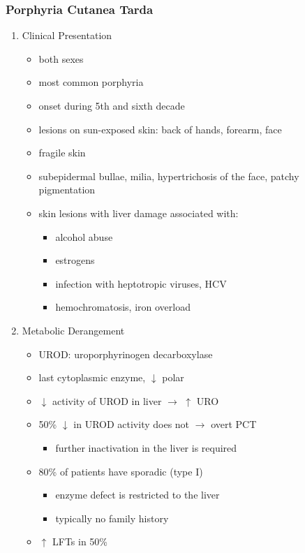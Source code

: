 \documentclass[12pt]{scrartcl}
\begin{document}
\subsubsection{Porphyria Cutanea Tarda}
\label{sec:org05aea69}
\begin{enumerate}
\item Clinical Presentation
\label{sec:orgce4fb31}
\begin{itemize}
\item both sexes
\item most common porphyria
\item onset during 5th and sixth decade
\item lesions on sun-exposed skin: back of hands, forearm, face
\item fragile skin
\item subepidermal bullae, milia, hypertrichosis of the face, patchy pigmentation
\item skin lesions with liver damage associated with:
\begin{itemize}
\item alcohol abuse
\item estrogens
\item infection with heptotropic viruses, HCV
\item hemochromatosis, iron overload
\end{itemize}
\end{itemize}
\item Metabolic Derangement
\label{sec:org9eb0249}
\begin{itemize}
\item UROD: uroporphyrinogen decarboxylase
\item last cytoplasmic enzyme, \(\downarrow\) polar
\item \(\downarrow\) activity of UROD in liver \(\to\) \(\uparrow\) URO
\item 50\% \(\downarrow\) in UROD activity does not \(\to\) overt PCT
\begin{itemize}
\item further inactivation in the liver is required
\end{itemize}
\item 80\% of patients have sporadic (type I)
\begin{itemize}
\item enzyme defect is restricted to the liver
\item typically no family history
\end{itemize}
\item \(\uparrow\) LFTs in 50\%

\end{itemize}
\end{enumerate}
\end{document}
